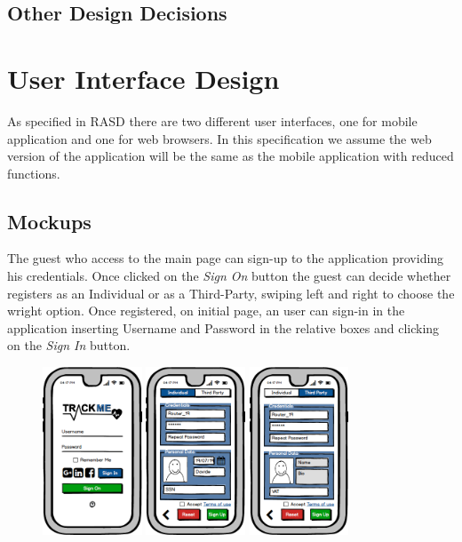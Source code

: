 \documentclass[a4paper]{article}
\begin{document}
\subsection{Other Design Decisions}

\newpage
\section{User Interface Design}
As specified in RASD there are two different user interfaces, one for mobile application and one for web browsers. In this specification we assume the web version of the application will be the same as the mobile application with reduced functions.

\subsection{Mockups}
The guest who access to the main page can sign-up to the application providing his credentials. Once clicked on the \textit{Sign On} button the guest can decide whether registers as an Individual or as a Third-Party, swiping left and right to choose the wright option. Once registered, on initial page, an user can sign-in in the application inserting Username and Password in the relative boxes and clicking on the \textit{Sign In} button. 

\begin{figure}[!htpb]
    	\centering
    	\includegraphics[height=50mm]{images/mockups/Login_Registration.png}
    	\includegraphics[height=50mm]{images/mockups/RegistrationForm.png}
    	\includegraphics[height=50mm]{images/mockups/ThirdPartyRegistration.png}
        \end{figure}
\end{document}
